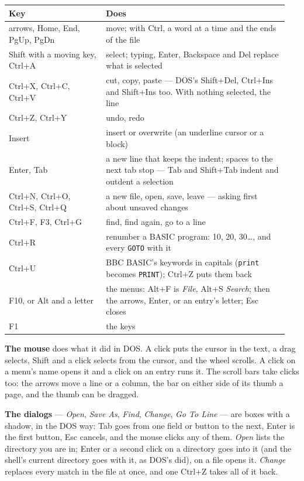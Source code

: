 \begin{center}
\small
\begin{tabular}{@{}>{\raggedright\arraybackslash}p{0.33\linewidth} >{\raggedright\arraybackslash}p{0.62\linewidth}@{}}
\toprule
\textbf{Key} & \textbf{Does} \\
\midrule
arrows, Home, End, PgUp, PgDn & move; with Ctrl, a word at a time and the ends of the file \\
Shift with a moving key, Ctrl+A & select; typing, Enter, Backspace and Del replace what is selected \\
Ctrl+X, Ctrl+C, Ctrl+V & cut, copy, paste --- DOS's Shift+Del, Ctrl+Ins and Shift+Ins too. With nothing selected, the line \\
Ctrl+Z, Ctrl+Y & undo, redo \\
Insert & insert or overwrite (an underline cursor or a block) \\
Enter, Tab & a new line that keeps the indent; spaces to the next tab stop --- Tab and Shift+Tab indent and outdent a selection \\
Ctrl+N, Ctrl+O, Ctrl+S, Ctrl+Q & a new file, open, save, leave --- asking first about unsaved changes \\
Ctrl+F, F3, Ctrl+G & find, find again, go to a line \\
Ctrl+R & renumber a BASIC program: 10, 20, 30\ldots, and every \texttt{GOTO} with it \\
Ctrl+U & BBC BASIC's keywords in capitals (\texttt{print} becomes \texttt{PRINT}); Ctrl+Z puts them back \\
F10, or Alt and a letter & the menus: Alt+F is \emph{File}, Alt+S \emph{Search}; then the arrows, Enter, or an entry's letter; Esc closes \\
F1 & the keys \\
\bottomrule
\end{tabular}
\end{center}

\textbf{The mouse} does what it did in DOS. A click puts the cursor in the
text, a drag selects, Shift and a click selects from the cursor, and the
wheel scrolls. A click on a menu's name opens it and a click on an entry
runs it. The scroll bars take clicks too: the arrows move a line or a
column, the bar on either side of its thumb a page, and the thumb can be
dragged.

\textbf{The dialogs} --- \emph{Open}, \emph{Save As}, \emph{Find},
\emph{Change}, \emph{Go To Line} --- are boxes with a shadow, in the DOS
way: Tab goes from one field or button to the next, Enter is the first
button, Esc cancels, and the mouse clicks any of them. \emph{Open} lists
the directory you are in; Enter or a second click on a directory goes into
it (and the shell's current directory goes with it, as DOS's did), on a
file opens it. \emph{Change} replaces every match in the file at once, and
one Ctrl+Z takes all of it back.

